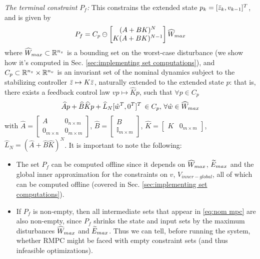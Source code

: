 \textit{The terminal constraint $P_f$:}
This constrains the extended state $p_k = [\bar{z}_{k}, v_{k-1}]^T$, and is given by 
\begin{equation}
\label{eq:P_f_def}
P_f = C_p\ominus \left\lbrack \begin{matrix} (A+BK)^N \\ K(A+BK)^{N-1}\end{matrix} \right \rbrack \widehat{W}_{max}
\end{equation}
where $\widehat{W}_{max} \subset \mathbb{R}^{n_z}$ is a bounding set on the worst-case disturbance (we show how it's computed in Sec. \ref{sec:implementing set computations}),
and $C_p \subset \mathbb{R}^{n_z}\times \mathbb{R}^{n_v}$ is an invariant set of the nominal dynamics subject to the stabilizing controller $\bar{z} \mapsto K\bar{z}$, naturally extended to the extended state $p$:
that is, there exists a feedback control law $vp \mapsto \widehat{K}p$, such that $\forall p\in C_p$
\begin{eqnarray}
\label{eq:C_def}
\widehat{A} p + \widehat{B} \widehat{K} p + \widehat{L}_N  [\hat{w}^T, 0^T]^T \, \in C_p,\, \forall \hat{w} \in \widehat{W}_{max} 
\end{eqnarray}
with $\widehat{A} = \begin{bmatrix} A & 0_{n \times m} \\ 0_{m \times n} & 0_{m \times m}   \end{bmatrix} $,
$\widehat{B} = \begin{bmatrix}  B \\ \mathbb{I}_{m \times m} \end{bmatrix}$, 
$\widehat{K} = \begin{bmatrix}  K & 0_{m \times m}  \end{bmatrix}$,
$\widehat{L} _N = (\widehat{A} + \widehat{B} \widehat{K})^N$.
It is important to note the following:
\begin{itemize}
	\item The set $P_f$ can be computed offline since it depends on $\widehat{W}_{max}$, $\widetilde{E}_{max}$ and the global inner approximation for the constraints on $v$, $V_{inner-global}$, all of which can be computed offline (covered in Sec. \ref{sec:implementing set computations}).
	\item If $P_f$ is non-empty, then all intermediate sets that appear in \eqref{eq:nom mpc} are also non-empty, since $P_f$ shrinks the state and input sets by the maximum disturbances $\widehat{W}_{max}$ and $\widetilde{E}_{max}$.	
	Thus we can tell, before running the system, whether RMPC might be faced with empty constraint sets (and thus infeasible optimizations).
\end{itemize}
